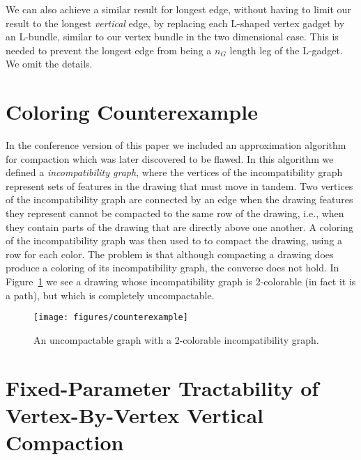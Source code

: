 \documentclass[12pt]{article}
\theoremstyle{definitions}
\begin{document}
We can also achieve a similar result for longest edge, without having to limit
our result to the longest \emph{vertical} edge, by replacing each L-shaped vertex gadget
by an L-bundle, similar to our vertex bundle in the two dimensional case. This is needed to prevent the longest edge from being a $n_G$ length leg of the L-gadget. We
omit the details.

\section{Coloring Counterexample}
In the conference version of this paper we included an approximation algorithm for compaction which was later discovered to be flawed. In this algorithm we defined a \emph{incompatibility graph}, where the vertices of the incompatibility graph represent sets of features in the drawing that must move in tandem. Two vertices of the incompatibility graph are connected by an edge when the drawing features they represent cannot be compacted to the same row of the drawing, i.e., when they contain parts of the drawing that are directly above one another. A coloring of the incompatibility graph was then used to to compact the drawing, using a row for each color. The problem is that although compacting a drawing does produce a coloring of its incompatibility graph, the converse does not hold. In Figure~\ref{fig:cexamp} we see a drawing whose incompatibility graph is 2-colorable (in fact it is a path), but which is completely uncompactable.

\begin{figure}[ht!]
\centering
\texttt{[image: figures/counterexample]}
\caption{An uncompactable graph with a 2-colorable incompatibility graph.}
\label{fig:cexamp}
\end{figure}

\section{Fixed-Parameter Tractability of \\Vertex-By-Vertex Vertical Compaction}
\end{document}
